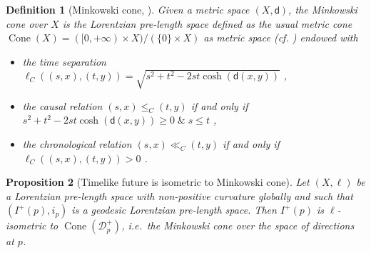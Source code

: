\documentclass[hidelinks,12pt,a4paper]{article}
\numberwithin{equation}{section}
\theoremstyle{plain}
\newtheorem{definition}{Definition}[section]
\newtheorem{proposition}[definition]{Proposition}
\theoremstyle{definition}
\DeclareMathOperator{\Cone}{Cone}
\newcommand{\LpLSn}{Lo\-rentz\-ian pre-length space}
\begin{document}
\begin{definition}[{Minkowski cone, \cite[Definition 3.16]{BS23}}]
Given a metric space $(X, \mathsf d)$, the Minkowski cone over $X$ is the Lorentzian pre-length space defined as the usual metric cone $\Cone(X)=([0,+ \infty) \times X)/( \{0\} \times X)$ as metric space (cf. \emph{\cite[Definition 3.6.16]{BurBurIva}}) endowed with
\begin{itemize}
    \item the time separation $\ell_{C} ((s,x),(t,y))=\sqrt{s^2+t^2-2st\cosh(\mathsf d(x,y))}$ ,
\item the causal relation $(s,x) \leq_C (t,y)$ if and only if $ s^2+t^2-2st\cosh(\mathsf d(x,y)) \geq 0 \; \& \; s \leq t$ ,
\item the chronological relation $(s,x) \ll_C (t,y)$ if and only if $\ell_{C}((s,x),(t,y)) > 0$ .
\end{itemize}
\end{definition}

\begin{proposition}[Timelike future is isometric to Minkowski cone] 
\label{prop: isometry into the minkowski cone}
Let $(X, \ell)$ be a Lorentzian pre-length space with non-positive curvature globally and such that $(I^+(p),i_p)$ is a geodesic \LpLSn.
Then $I^+(p)$ is $\ell$-isometric to $\Cone(\mathcal D_p^+)$, i.e.\ the Minkowski cone over the space of directions at $p$. 
\end{proposition}
\end{document}
